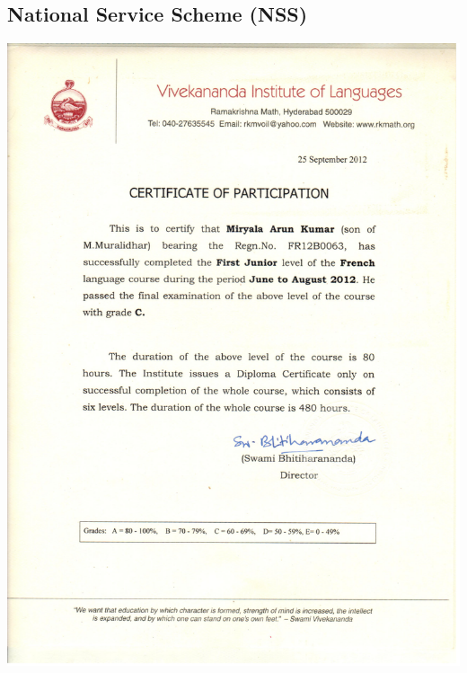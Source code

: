 \documentclass{article}
\begin{document}
	\subsection{National Service Scheme (NSS)}
		\includegraphics[page=2, scale=0.5]{proofs/nss.pdf}\\
\end{document}
